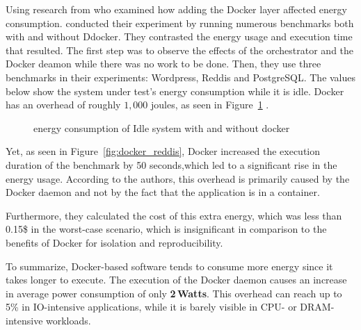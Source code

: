 Using research from \cite{eddie_antonio_santos_how} who examined how adding the Docker layer affected energy consumption. \citeauthor{eddie_antonio_santos_how} conducted their experiment by running numerous benchmarks both with and without Ddocker. They contrasted the energy usage and execution time that resulted.
The first step was to observe the effects of the orchestrator and the Docker deamon while there was no work to be done.
Then, they use three benchmarks in their experiments: Wordpress, Reddis and PostgreSQL.
The values below show the system under test's energy consumption while it is idle.
Docker has an overhead of roughly $1,000$  joules, as seen in Figure~\ref{fig:docker_idle} .


\begin{figure}
    \caption{energy consumption of Idle system with and without docker \cite{eddie_antonio_santos_how}}\label{fig:docker_idle}
\end{figure}

Yet, as seen in Figure~\ref{fig:docker_reddis}, Docker increased the execution duration of the benchmark by 50 seconds,which led to a significant rise in the energy usage.
According to the authors, this overhead is primarily caused by the Docker daemon and not by the fact that  the application is in a container.


Furthermore, they calculated the cost of this extra energy, which was less than 0.15\$ in the worst-case scenario, which is insignificant in comparison to the benefits of Docker for isolation and reproducibility.

To summarize, Docker-based software tends to consume more energy since it takes longer to execute.
The execution of the Docker daemon causes an increase in average power consumption of only \textbf{2\,Watts}.
This overhead can reach up to 5\% in IO-intensive applications, while it is barely visible in CPU- or DRAM-intensive workloads.



